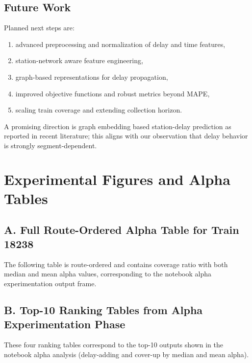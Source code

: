 \documentclass[12pt,a4paper]{report}
\begin{document}
\section{Future Work}
Planned next steps are:
\begin{enumerate}
    \item advanced preprocessing and normalization of delay and time features,
    \item station-network aware feature engineering,
    \item graph-based representations for delay propagation,
    \item improved objective functions and robust metrics beyond MAPE,
    \item scaling train coverage and extending collection horizon.
\end{enumerate}

A promising direction is graph embedding based station-delay prediction as reported in recent literature; this aligns with our observation that delay behavior is strongly segment-dependent.

\clearpage



\appendix


\chapter{Experimental Figures and Alpha Tables}

\section*{A. Full Route-Ordered Alpha Table for Train 18238}
The following table is route-ordered and contains coverage ratio with both median and mean alpha values, corresponding to the notebook alpha experimentation output frame.



\section*{B. Top-10 Ranking Tables from Alpha Experimentation Phase}
These four ranking tables correspond to the top-10 outputs shown in the notebook alpha analysis (delay-adding and cover-up by median and mean alpha).
\end{document}
